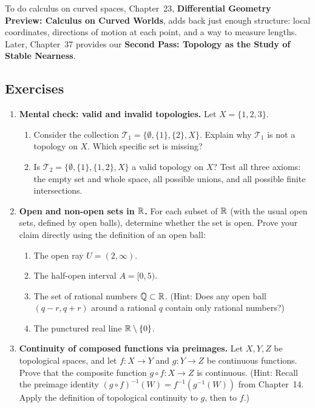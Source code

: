 To do calculus on curved spaces, Chapter~23, \textbf{Differential Geometry Preview: Calculus on Curved Worlds}, adds back just enough structure: local coordinates, directions of motion at each point, and a way to measure lengths. Later, Chapter~37 provides our \textbf{Second Pass: Topology as the Study of Stable Nearness}.

\subsection{Exercises}

\begin{enumerate}
\item \textbf{Mental check: valid and invalid topologies.}
Let $X = \{1, 2, 3\}$.
\begin{enumerate}[label=(\alph*)]
\item Consider the collection $\mathcal{T}_1 = \{\emptyset, \{1\}, \{2\}, X\}$. Explain why $\mathcal{T}_1$ is not a topology on $X$. Which specific set is missing?
\item Is $\mathcal{T}_2 = \{\emptyset, \{1\}, \{1, 2\}, X\}$ a valid topology on $X$? Test all three axioms: the empty set and whole space, all possible unions, and all possible finite intersections.
\end{enumerate}

\item \textbf{Open and non-open sets in $\mathbb{R}$.}
For each subset of $\mathbb{R}$ (with the usual open sets, defined by open balls), determine whether the set is open. Prove your claim directly using the definition of an open ball:
\begin{enumerate}[label=(\alph*)]
\item The open ray $U = (2, \infty)$.
\item The half-open interval $A = [0, 5)$.
\item The set of rational numbers $\mathbb{Q} \subset \mathbb{R}$. (Hint: Does any open ball $(q - r, q + r)$ around a rational $q$ contain only rational numbers?)
\item The punctured real line $\mathbb{R} \setminus \{0\}$.
\end{enumerate}

\item \textbf{Continuity of composed functions via preimages.}
Let $X, Y, Z$ be topological spaces, and let $f: X \to Y$ and $g: Y \to Z$ be continuous functions. Prove that the composite function $g \circ f: X \to Z$ is continuous.
(Hint: Recall the preimage identity $(g \circ f)^{-1}(W) = f^{-1}(g^{-1}(W))$ from Chapter~14. Apply the definition of topological continuity to $g$, then to $f$.)


\end{enumerate}
